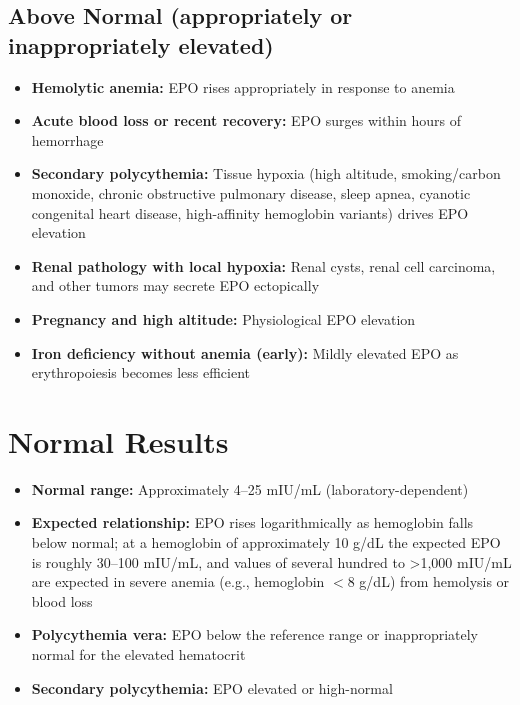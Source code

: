 \subsection*{Above Normal (appropriately or inappropriately elevated)}
\begin{itemize}
  \item \textbf{Hemolytic anemia:} EPO rises appropriately in response to anemia
  \item \textbf{Acute blood loss or recent recovery:} EPO surges within hours of hemorrhage
  \item \textbf{Secondary polycythemia:} Tissue hypoxia (high altitude, smoking/carbon monoxide, chronic obstructive pulmonary disease, sleep apnea, cyanotic congenital heart disease, high-affinity hemoglobin variants) drives EPO elevation
  \item \textbf{Renal pathology with local hypoxia:} Renal cysts, renal cell carcinoma, and other tumors may secrete EPO ectopically
  \item \textbf{Pregnancy and high altitude:} Physiological EPO elevation
  \item \textbf{Iron deficiency without anemia (early):} Mildly elevated EPO as erythropoiesis becomes less efficient
\end{itemize}

\section*{Normal Results}
\begin{itemize}
  \item \textbf{Normal range:} Approximately 4--25 mIU/mL (laboratory-dependent)
  \item \textbf{Expected relationship:} EPO rises logarithmically as hemoglobin falls below normal; at a hemoglobin of approximately 10 g/dL the expected EPO is roughly 30--100 mIU/mL, and values of several hundred to >1,000 mIU/mL are expected in severe anemia (e.g., hemoglobin $<$8 g/dL) from hemolysis or blood loss
  \item \textbf{Polycythemia vera:} EPO below the reference range or inappropriately normal for the elevated hematocrit
  \item \textbf{Secondary polycythemia:} EPO elevated or high-normal
\end{itemize}

